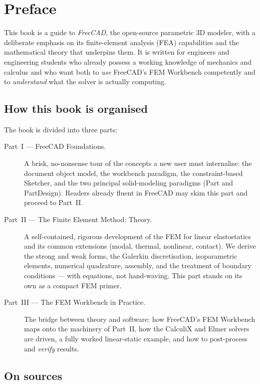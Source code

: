 \chapter*{Preface}

This book is a guide to \emph{FreeCAD}, the open-source parametric 3D
modeler, with a deliberate emphasis on its finite-element analysis (FEA)
capabilities and the mathematical theory that underpins them. It is
written for engineers and engineering students who already possess a
working knowledge of mechanics and calculus and who want both to
\emph{use} FreeCAD's FEM Workbench competently and to \emph{understand}
what the solver is actually computing.

\section*{How this book is organised}

The book is divided into three parts:

\begin{description}
  \item[Part~I --- FreeCAD Foundations.] A brisk, no-nonsense tour of
    the concepts a new user must internalise: the document object model,
    the workbench paradigm, the constraint-based Sketcher, and the two
    principal solid-modeling paradigms (\textsf{Part} and
    \textsf{PartDesign}). Readers already fluent in FreeCAD may skim
    this part and proceed to Part~II.
  \item[Part~II --- The Finite Element Method: Theory.] A self-contained,
    rigorous development of the FEM for linear elastostatics and its
    common extensions (modal, thermal, nonlinear, contact). We derive the
    strong and weak forms, the Galerkin discretisation, isoparametric
    elements, numerical quadrature, assembly, and the treatment of
    boundary conditions --- with equations, not hand-waving. This part
    stands on its own as a compact FEM primer.
  \item[Part~III --- The FEM Workbench in Practice.] The bridge between
    theory and software: how FreeCAD's FEM Workbench maps onto the
    machinery of Part~II, how the CalculiX and Elmer solvers are driven,
    a fully worked linear-static example, and how to post-process and
    \emph{verify} results.
\end{description}

\section*{On sources}

